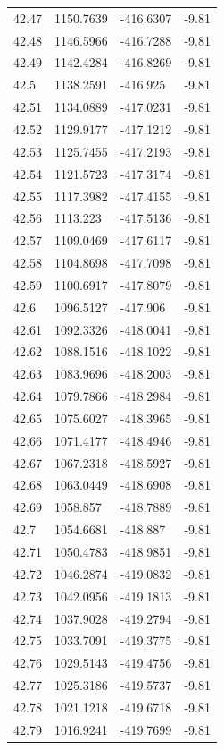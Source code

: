 \begin{table}[H]
\begin{tabular}{llll}
42.47 & 1150.7639 & -416.6307 & -9.81 \\
42.48 & 1146.5966 & -416.7288 & -9.81 \\
42.49 & 1142.4284 & -416.8269 & -9.81 \\
42.5 & 1138.2591 & -416.925 & -9.81 \\
42.51 & 1134.0889 & -417.0231 & -9.81 \\
42.52 & 1129.9177 & -417.1212 & -9.81 \\
42.53 & 1125.7455 & -417.2193 & -9.81 \\
42.54 & 1121.5723 & -417.3174 & -9.81 \\
42.55 & 1117.3982 & -417.4155 & -9.81 \\
42.56 & 1113.223 & -417.5136 & -9.81 \\
42.57 & 1109.0469 & -417.6117 & -9.81 \\
42.58 & 1104.8698 & -417.7098 & -9.81 \\
42.59 & 1100.6917 & -417.8079 & -9.81 \\
42.6 & 1096.5127 & -417.906 & -9.81 \\
42.61 & 1092.3326 & -418.0041 & -9.81 \\
42.62 & 1088.1516 & -418.1022 & -9.81 \\
42.63 & 1083.9696 & -418.2003 & -9.81 \\
42.64 & 1079.7866 & -418.2984 & -9.81 \\
42.65 & 1075.6027 & -418.3965 & -9.81 \\
42.66 & 1071.4177 & -418.4946 & -9.81 \\
42.67 & 1067.2318 & -418.5927 & -9.81 \\
42.68 & 1063.0449 & -418.6908 & -9.81 \\
42.69 & 1058.857 & -418.7889 & -9.81 \\
42.7 & 1054.6681 & -418.887 & -9.81 \\
42.71 & 1050.4783 & -418.9851 & -9.81 \\
42.72 & 1046.2874 & -419.0832 & -9.81 \\
42.73 & 1042.0956 & -419.1813 & -9.81 \\
42.74 & 1037.9028 & -419.2794 & -9.81 \\
42.75 & 1033.7091 & -419.3775 & -9.81 \\
42.76 & 1029.5143 & -419.4756 & -9.81 \\
42.77 & 1025.3186 & -419.5737 & -9.81 \\
42.78 & 1021.1218 & -419.6718 & -9.81 \\
42.79 & 1016.9241 & -419.7699 & -9.81 \\

\end{tabular}
\end{table}
